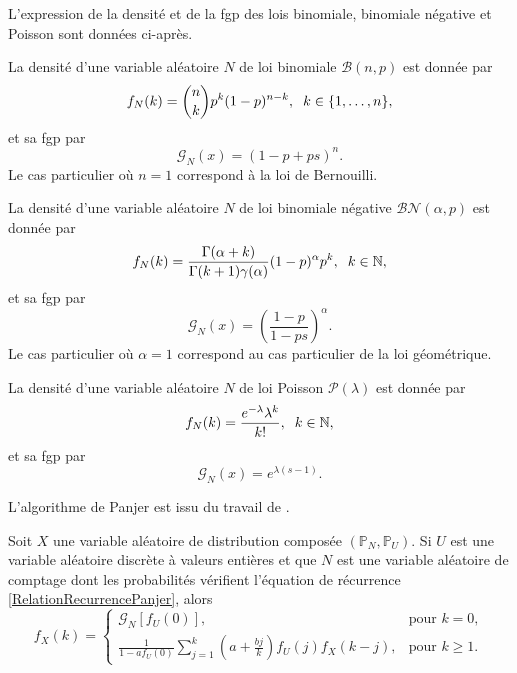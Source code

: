 L\rq{}expression de la densité et de la \gls{fgp} des lois binomiale, binomiale négative et Poisson sont données ci-après. 
\begin{Def}\label{BinomialDefinition}
La densité d'une variable aléatoire $N$ de loi binomiale $\mathcal{B}(n,p)$ est donnée par
\begin{equation}\label{BinomialDensity}
f_{N}(k)=\binom{n}{k}p^{k}(1-p)^{n-k},\hspace{0.2cm}k\in\{1,\ldots,n\},
\end{equation}
et sa \gls{fgp} par 
\begin{equation}\label{BInomialFGP}
\mathcal{G}_{N}(x)=\left(1-p+ps\right)^{n}.
\end{equation}
Le cas particulier où $n=1$ correspond à la loi de Bernouilli.
\end{Def}
\begin{Def}\label{NegativeBinomialDefinition}
La densité d'une variable aléatoire $N$ de loi binomiale négative $\mathcal{BN}(\alpha,p)$ est donnée par
\begin{equation}\label{NegativeBinomialDensity}
f_{N}(k)=\frac{\Gamma(\alpha+k)}{\Gamma(k+1)\gamma(\alpha)}(1-p)^{\alpha}p^{k},\hspace{0.2cm}k\in\mathbb{N},
\end{equation}
et sa \gls{fgp} par 
\begin{equation}\label{NegativeBInomialFGP}
\mathcal{G}_{N}(x)=\left(\frac{1-p}{1-ps}\right)^{\alpha}.
\end{equation}
Le cas particulier où $\alpha=1$ correspond au cas particulier de la loi géométrique.
\end{Def}
\begin{Def}\label{PoissonDefinition}
La densité d'une variable aléatoire $N$ de loi Poisson $\mathcal{P}(\lambda)$ est donnée par
\begin{equation}\label{PoissonDensity}
f_{N}(k)=\frac{e^{-\lambda}\lambda^{k}}{k!},\hspace{0.2cm}k\in\mathbb{N},
\end{equation}
et sa \gls{fgp} par 
\begin{equation}\label{PoissonFGP}
\mathcal{G}_{N}(x)=e^{\lambda(s-1)}.
\end{equation}
\end{Def}
L\rq{}algorithme de Panjer est issu du travail de \citet{Pa81}.
\begin{Theo}[Panjer (1981)]\label{PanjerRecursionTheorem}
Soit $X$ une variable aléatoire de distribution composée $(\mathbb{P}_{N},\mathbb{P}_{U})$. Si $U$ est une variable aléatoire discrète à valeurs entières et que $N$ est une variable aléatoire de comptage dont les probabilités vérifient l\rq{}équation de récurrence \eqref{RelationRecurrencePanjer}, alors 
\begin{equation}\label{PanjerRecursiveFormula}
f_{X}(k)=
\begin{cases} 
\mathcal{G}_{N}\left[f_{U}(0)\right], &\mbox{pour } k = 0, \\ 
 \frac{1}{1-af_{U}(0)}\sum_{j=1}^{k}\left(a+\frac{bj}{k}\right)f_{U}(j)f_{X}(k-j),& \mbox{pour } k \geq 1. \end{cases}
\end{equation} 
\end{Theo}
